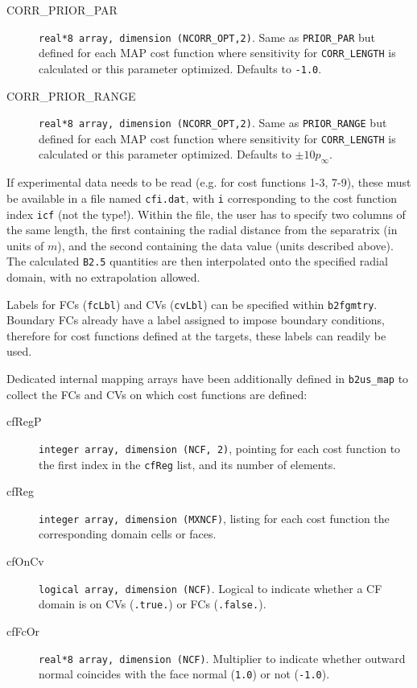 \begin{description}
  \item[CORR\_PRIOR\_PAR] {\tt real*8 array, dimension (NCORR\_OPT,2)}. Same as {\tt PRIOR\_PAR} but defined for each MAP cost function where sensitivity for {\tt CORR\_LENGTH} is calculated or this parameter optimized. Defaults to {\tt -1.0}.
  \item[CORR\_PRIOR\_RANGE] {\tt real*8 array, dimension (NCORR\_OPT,2)}. Same as {\tt PRIOR\_RANGE} but defined for each MAP cost function where sensitivity for {\tt CORR\_LENGTH} is calculated or this parameter optimized. Defaults to {\tt $\pm 10p_{\infty}$}.
\end{description}


If experimental data needs to be read (e.g. for cost functions 1-3, 7-9), these must be available in a file named {\tt cfi.dat}, with {\tt i} corresponding to the cost function index  {\tt icf} (not the type!). Within the file, the user has to specify two columns of the same length, the first containing the radial distance from the separatrix (in units of $m$), and the second containing the data value (units described above). The calculated {\tt B2.5} quantities are then interpolated onto the specified radial domain, with no extrapolation allowed.

Labels for FCs ({\tt fcLbl}) and CVs ({\tt cvLbl}) can be specified within {\tt b2fgmtry}. Boundary FCs already have a label assigned to impose boundary conditions, therefore for cost functions defined at the targets, these labels can readily be used.

Dedicated internal mapping arrays have been additionally defined in {\tt b2us\_map} to collect the FCs and CVs on which cost functions are defined:
\begin{description}
  \item[cfRegP]  {\tt integer array, dimension (NCF, 2)}, pointing for each cost function to the first index in the {\tt cfReg} list, and its number of elements.
  \item[cfReg]  {\tt integer array, dimension (MXNCF)}, listing for each cost function the corresponding domain cells or faces.
  \item[cfOnCv]  {\tt logical array, dimension (NCF)}. Logical to indicate whether a CF domain is on CVs ({\tt .true.}) or FCs ({\tt .false.}).
  \item[cfFcOr]  {\tt real*8 array, dimension (NCF)}. Multiplier to indicate whether outward normal coincides with the face normal ({\tt 1.0}) or not ({\tt -1.0}).
\end{description}

